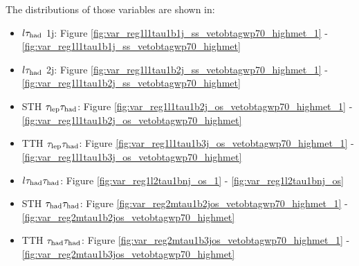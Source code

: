 \begin{enumerate}
The distributions of those variables are shown in:
\begin{itemize}
	\item $l\tau_\text{had}$ 1j: Figure  		\ref{fig:var_reg1l1tau1b1j_ss_vetobtagwp70_highmet_1}
								-	\ref{fig:var_reg1l1tau1b1j_ss_vetobtagwp70_highmet}
	\item $l\tau_\text{had}$ 2j: Figure  		\ref{fig:var_reg1l1tau1b2j_ss_vetobtagwp70_highmet_1}
								-	\ref{fig:var_reg1l1tau1b2j_ss_vetobtagwp70_highmet}
	\item STH $\tau_\text{lep}{}\tau_\text{had}$: Figure 		\ref{fig:var_reg1l1tau1b2j_os_vetobtagwp70_highmet_1}
							 	-	\ref{fig:var_reg1l1tau1b2j_os_vetobtagwp70_highmet}
	\item TTH $\tau_\text{lep}{}\tau_\text{had}$: Figure 		\ref{fig:var_reg1l1tau1b3j_os_vetobtagwp70_highmet_1}
								-	\ref{fig:var_reg1l1tau1b3j_os_vetobtagwp70_highmet}
	\item $l\tau_\text{had}{}\tau_\text{had}$: Figure 		\ref{fig:var_reg1l2tau1bnj_os_1}
								-	\ref{fig:var_reg1l2tau1bnj_os}
	\item STH $\tau_\text{had}{}\tau_\text{had}$: Figure 	\ref{fig:var_reg2mtau1b2jos_vetobtagwp70_highmet_1}
								-	\ref{fig:var_reg2mtau1b2jos_vetobtagwp70_highmet}
	\item TTH $\tau_\text{had}{}\tau_\text{had}$: Figure 	\ref{fig:var_reg2mtau1b3jos_vetobtagwp70_highmet_1}
								-	\ref{fig:var_reg2mtau1b3jos_vetobtagwp70_highmet}
\end{itemize}









\end{enumerate}
